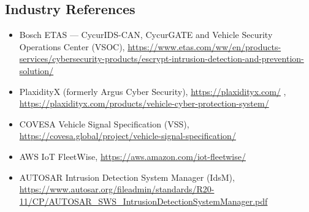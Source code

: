 \documentclass{article}
\begin{document}
\subsection{Industry References}
\begin{itemize}[noitemsep]
    \item Bosch ETAS — CycurIDS-CAN, CycurGATE and Vehicle Security Operations Center (VSOC), \url{https://www.etas.com/ww/en/products-services/cybersecurity-products/escrypt-intrusion-detection-and-prevention-solution/}
    \item PlaxidityX (formerly Argus Cyber Security), \url{https://plaxidityx.com/} , \url{https://plaxidityx.com/products/vehicle-cyber-protection-system/}
    \item COVESA Vehicle Signal Specification (VSS), \url{https://covesa.global/project/vehicle-signal-specification/}
    \item AWS IoT FleetWise, \url{https://aws.amazon.com/iot-fleetwise/}
    \item AUTOSAR Intrusion Detection System Manager (IdsM), \url{https://www.autosar.org/fileadmin/standards/R20-11/CP/AUTOSAR_SWS_IntrusionDetectionSystemManager.pdf}
\end{itemize}
\end{document}
